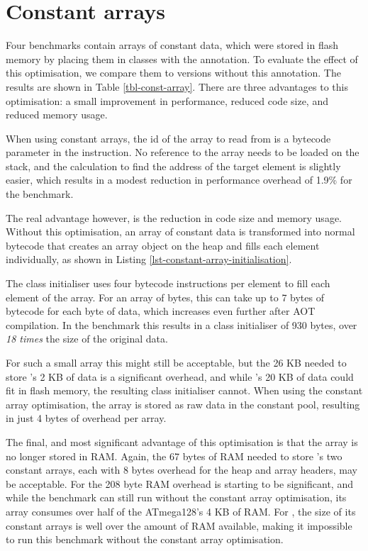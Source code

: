 \section{Constant arrays}
\label{sec-evaluation-const-array}


Four benchmarks contain arrays of constant data, which were stored in flash memory by placing them in classes with the  annotation. To evaluate the effect of this optimisation, we compare them to versions without this annotation. The results are shown in Table \ref{tbl-const-array}. There are three advantages to this optimisation: a small improvement in performance, reduced code size, and reduced memory usage.

When using constant arrays, the id of the array to read from is a bytecode parameter in the  instruction. No reference to the array needs to be loaded on the stack, and the calculation to find the address of the target element is slightly easier, which results in a modest reduction in performance overhead of 1.9\% for the  benchmark.

The real advantage however, is the reduction in code size and memory usage. Without this optimisation, an array of constant data is transformed into normal bytecode that creates an array object on the heap and fills each element individually, as shown in Listing \ref{lst-constant-array-initialisation}.

The class initialiser uses four bytecode instructions per element to fill each element of the array. For an array of bytes, this can take up to 7 bytes of bytecode for each byte of data, which increases even further after AOT compilation. In the  benchmark this results in a class initialiser of 930 bytes, over \emph{18 times} the size of the original data. 

For such a small array this might still be acceptable, but the 26 KB needed to store 's 2 KB of data is a significant overhead, and while 's 20 KB of data could fit in flash memory, the resulting class initialiser cannot. When using the constant array optimisation, the array is stored as raw data in the constant pool, resulting in just 4 bytes of overhead per array.

The final, and most significant advantage of this optimisation is that the array is no longer stored in RAM. Again, the 67 bytes of RAM needed to store 's two constant arrays, each with 8 bytes overhead for the heap and array headers, may be acceptable. For  the 208 byte RAM overhead is starting to be significant, and while the  benchmark can still run without the constant array optimisation, its array consumes over half of the ATmega128's 4 KB of RAM. For , the size of its constant arrays is well over the amount of RAM available, making it impossible to run this benchmark without the constant array optimisation.